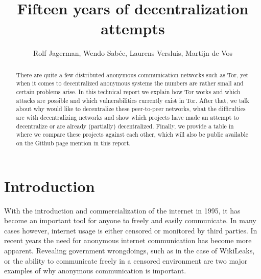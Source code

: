 \documentclass{article}
\begin{document}


\title{Fifteen years of decentralization attempts}
\author{Rolf Jagerman, Wendo Sab\'ee, Laurens Versluis, Martijn de Vos}
\date{}

\pagestyle{empty}


\maketitle
\thispagestyle{empty}

\begin{abstract}
	There are quite a few distributed anonymous communication networks such as Tor, yet when it comes to decentralized anonymous systems the numbers are rather small and certain problems arise. In this technical report we explain how Tor works and which attacks are possible and which vulnerabilities currently exist in Tor. After that, we talk about why would like to decentralize these peer-to-peer networks, what the difficulties are with decentralizing networks and show which projects have made an attempt to decentralize or are already (partially) decentralized. Finally, we provide a table in where we compare these projects against each other, which will also be public available on the Github page mention in this report.
\end{abstract}


\section{Introduction}
	With the introduction and commercialization of the internet in 1995, it has become an important tool for anyone to freely and easily communicate. In many cases however, internet usage is either censored or monitored by third parties. In recent years the need for anonymous internet communication has become more apparent. Revealing government wrongdoings, such as in the case of WikiLeaks, or the ability to communicate freely in a censored environment are two major examples of why anonymous communication is important.
	
\end{document}
